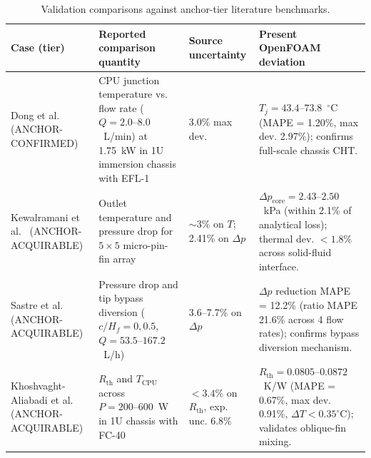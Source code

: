 \begin{table}[htbp]
\centering
\caption{Validation comparisons against anchor-tier literature benchmarks.}
\label{tab:vv-anchortier}
\scriptsize
\sloppy
\begin{tabular}{p{}p{}p{}p{}}
\hline
Case (tier) & Reported comparison quantity & Source uncertainty & Present OpenFOAM deviation \\
\hline
Dong et al.~\cite{dong2026} (ANCHOR-CONFIRMED) & CPU junction temperature vs. flow rate ($Q = 2.0\text{--}8.0$~L/min) at 1.75~kW in 1U immersion chassis with EFL-1 & 3.0\% max dev. & $T_j = 43.4\text{--}73.8$~$^{\circ}$C (MAPE = 1.20\%, max dev. 2.97\%); confirms full-scale chassis CHT. \\
Kewalramani et al.~\cite{kewalramani2019} (ANCHOR-ACQUIRABLE) & Outlet temperature and pressure drop for $5\times5$ micro-pin-fin array & $\sim 3\%$ on $T$; 2.41\% on $\Delta p$ & $\Delta p_{\mathrm{core}} = 2.43\text{--}2.50$~kPa (within 2.1\% of analytical loss); thermal dev. $<1.8\%$ across solid-fluid interface. \\
Sastre et al.~\cite{sastre2018} (ANCHOR-ACQUIRABLE) & Pressure drop and tip bypass diversion ($c/H_f = 0, 0.5$, $Q = 53.5\text{--}167.2$~L/h) & 3.6--7.7\% on $\Delta p$ & $\Delta p$ reduction MAPE = 12.2\% (ratio MAPE 21.6\% across 4 flow rates); confirms bypass diversion mechanism. \\
Khoshvaght-Aliabadi et al.~\cite{khoshvaghtaliabadi2026oblique} (ANCHOR-ACQUIRABLE) & $R_{\mathrm{th}}$ and $T_{\mathrm{CPU}}$ across $P = 200\text{--}600$~W in 1U chassis with FC-40 & $<3.4\%$ on $R_{\mathrm{th}}$, exp. unc. 6.8\% & $R_{\mathrm{th}} = 0.0805\text{--}0.0872$~K/W (MAPE = 0.67\%, max dev. 0.91\%, $\Delta T < 0.35^\circ$C); validates oblique-fin mixing. \\
\hline
\end{tabular}
\end{table}

